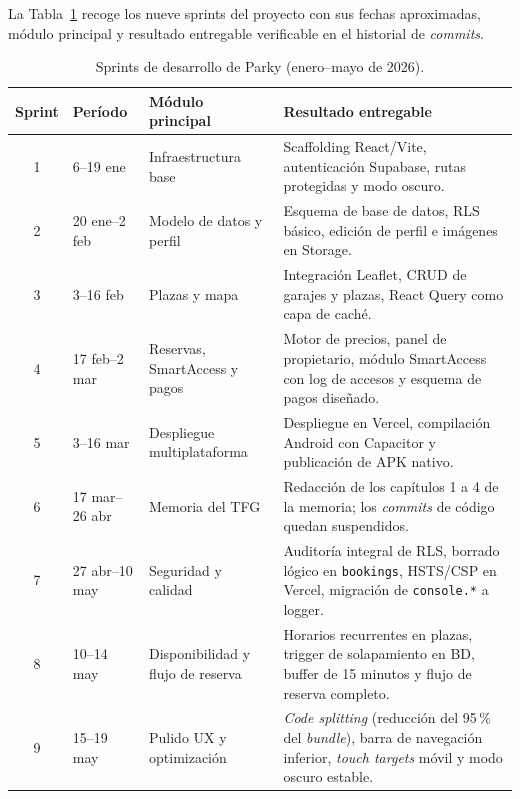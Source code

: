 La Tabla~\ref{tab:sprints} recoge los nueve sprints del proyecto con sus fechas aproximadas, módulo principal y resultado entregable verificable en el historial de \textit{commits}.

\begin{table}[htbp]
\centering
\caption{Sprints de desarrollo de Parky (enero–mayo de 2026).}
\label{tab:sprints}
\begin{tabularx}{\textwidth}{clXX}
\toprule
\textbf{Sprint} & \textbf{Período} & \textbf{Módulo principal} & \textbf{Resultado entregable} \\
\midrule
\rowcolor{gray!5}
1 & 6–19 ene & Infraestructura base & Scaffolding React/Vite, autenticación Supabase, rutas protegidas y modo oscuro. \\
2 & 20 ene–2 feb & Modelo de datos y perfil & Esquema de base de datos, RLS básico, edición de perfil e imágenes en Storage. \\
\rowcolor{gray!5}
3 & 3–16 feb & Plazas y mapa & Integración Leaflet, CRUD de garajes y plazas, React Query como capa de caché. \\
4 & 17 feb–2 mar & Reservas, SmartAccess y pagos & Motor de precios, panel de propietario, módulo SmartAccess con log de accesos y esquema de pagos diseñado. \\
\rowcolor{gray!5}
5 & 3–16 mar & Despliegue multiplataforma & Despliegue en Vercel, compilación Android con Capacitor y publicación de APK nativo. \\
6 & 17 mar–26 abr & Memoria del TFG & Redacción de los capítulos 1 a 4 de la memoria; los \textit{commits} de código quedan suspendidos. \\
\rowcolor{gray!5}
7 & 27 abr–10 may & Seguridad y calidad & Auditoría integral de RLS, borrado lógico en \texttt{bookings}, HSTS/CSP en Vercel, migración de \texttt{console.*} a logger. \\
8 & 10–14 may & Disponibilidad y flujo de reserva & Horarios recurrentes en plazas, trigger de solapamiento en BD, buffer de 15 minutos y flujo de reserva completo. \\
\rowcolor{gray!5}
9 & 15–19 may & Pulido UX y optimización & \textit{Code splitting} (reducción del 95\,\% del \textit{bundle}), barra de navegación inferior, \textit{touch targets} móvil y modo oscuro estable. \\
\bottomrule
\end{tabularx}
\end{table}

